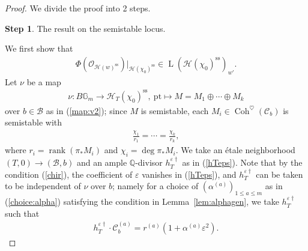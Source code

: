 \documentclass[11pt,oneside,a4paper,mathscr]{amsart}
\theoremstyle{definition}
\newtheorem{ssstep}{Step}
\renewcommand{\leq}{\leqslant}
\newcommand{\LL}{\operatorname{L}}
\newcommand{\cH}{\mathcal{H}}
\newcommand{\cB}{\mathcal{B}}
\newcommand{\cC}{\mathcal{C}}
\newcommand{\bgm}{B\mathbb{G}_m}
\newcommand{\Coh}{\operatorname{Coh}}
\begin{document}
\begin{proof}
We divide the proof into 2 steps.
\begin{ssstep}
The result on the semistable locus. 
\end{ssstep}
   We first show that 
   \begin{align}\label{Phi:rest}
\Phi(\mathcal{O}_{\cH(w)^{\mathrm{ss}}})|_{\cH(\chi_0)^{\mathrm{ss}}} \in \LL(\cH(\chi_0)^{\mathrm{ss}})_{w'}.
   \end{align}
Let $\nu$ be a map 
\begin{align*}
    \nu \colon \bgm \to \cH_T(\chi_0)^{\mathrm{ss}}, \ 
    \mathrm{pt} \mapsto M=M_1 \oplus \cdots \oplus M_k
\end{align*}
over $b\in \cB$ as in (\ref{map:v2}); since $M$ is semistable, 
each $M_i\in \Coh^{\heartsuit}(\cC_b)$ is semistable with 
\begin{align}\label{chir}
    \frac{\chi_1}{r_1}=\cdots=\frac{\chi_k}{r_k}, 
\end{align}
where $r_i=\operatorname{rank}(\pi_{*}M_i)$ and $\chi_i=\deg \pi_{*}M_i$. 
We take an \'{e}tale neighborhood $(T, 0)\to (\cB, b)$ and an ample $\mathbb{Q}$-divisor 
$h_T^{\varepsilon\dag}$ as in (\ref{hTeps}). 
Note that by the condition (\ref{chir}), the coefficient of $\varepsilon$ vanishes in (\ref{hTeps}), and 
$h_T^{\varepsilon\dag}$ can be taken to be independent of $\nu$ over $b$; namely 
for a choice of $(\alpha^{(a)})_{1\leq a\leq m}$ as in (\ref{choice:alpha})
satisfying the condition in Lemma~\ref{lem:alphagen}, 
we take $h_T^{\varepsilon\dag}$ such that 
\begin{align}\label{hT:indep}
    h_T^{\varepsilon\dag} \cdot \cC_b^{(a)}=r^{(a)}(1+\alpha^{(a)}\varepsilon^2).
\end{align}


\end{proof}
\end{document}
